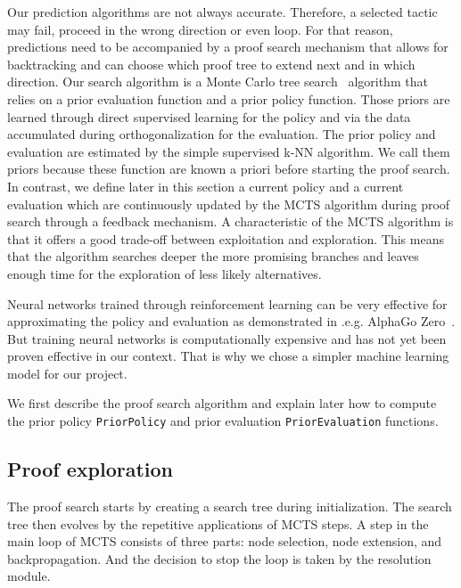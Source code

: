\documentclass[runningheads,a4paper,draft]{svjour3}
\begin{document}
Our prediction algorithms are not always accurate.
Therefore, a selected tactic may
fail, proceed in the wrong direction or even loop.
For that reason, predictions need to be accompanied by a
proof search mechanism that allows for backtracking and
can choose which proof tree to extend next and in which direction.
Our search algorithm is a Monte Carlo tree search~\cite{montecarlo} algorithm
that relies on a prior evaluation function and a prior policy function. Those 
priors are learned through direct supervised learning for the policy and via 
the data accumulated during orthogonalization for the evaluation. The
prior policy and evaluation are estimated by the simple supervised k-NN 
algorithm. We call them priors because these function are known a priori before 
starting the proof search. In contrast, we define later in this section a 
current policy and a current evaluation which are continuously updated by the 
MCTS algorithm during proof search through a feedback mechanism. A 
characteristic of the MCTS 
algorithm is that it offers a good 
trade-off between exploitation and exploration. This means that the algorithm 
searches deeper the more promising branches and leaves enough time for the 
exploration of less likely alternatives.

\begin{remark}
Neural networks trained through reinforcement learning can be
very effective for approximating the policy and evaluation as demonstrated in
.e.g. AlphaGo Zero~\cite{silver2017mastering}.
But training neural networks is
computationally expensive and has not yet been
proven effective in our context. That is why we chose a simpler machine
learning model for our project.
\end{remark}

We first describe the proof search algorithm and explain later how to compute
the prior policy \texttt{PriorPolicy} and prior evaluation
\texttt{PriorEvaluation} functions.

\subsection{Proof exploration}

The proof search starts by creating a search tree during initialization.
The search tree then evolves by the repetitive applications of MCTS steps. A
step in the main loop of MCTS consists of three parts: node selection, node
extension, and backpropagation. And the decision to stop the loop is taken
by the resolution module.
\end{document}
